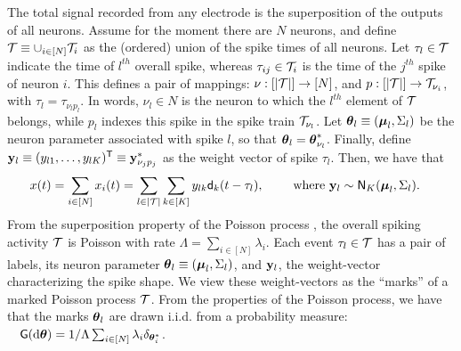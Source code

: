 % 
% 
% 
% 
{The total signal recorded from any electrode  is the superposition of the outputs of all neurons. Assume for the moment there are $N$
neurons, and define $\mathcal{T} \equiv \cup_{i \in [N]} \mathcal{T}_i$ as
the (ordered) union of the spike times of all neurons. 
Let $\tau_l \in \mathcal{T}$ indicate the time of $l^{th}$ overall spike, whereas $\tau_{ij} \in \mathcal{T}_i$ is the time of the $j^{th}$ spike of neuron $i$.
This defines a pair of mappings: $\nu:[|\mathcal{T}|]\rightarrow [N]$, and $p:[|\mathcal{T}|]\rightarrow \mathcal{T}_{\nu_i}$, with %
$\tau_l = \tau_{\nu_l p_l}$. 
In words, $\nu_l \in N$ is the neuron to which the $l^{th}$ element of $\mathcal{T}$ belongs, 
while $p_l$ indexes this spike in the spike train $\mathcal{T}_{\nu_l}$.
Let $\boldsymbol{\theta}_l \equiv (\boldsymbol{\mu}_l, \Sigma_l)$ be the neuron parameter associated with spike $l$, so that $\boldsymbol{\theta}_l = \boldsymbol{\theta}^*_{\nu_l}$. 
Finally, define $\mathbf{y}_l \equiv (y_{l1}, \ldots, y_{lK})^{\mathsf{T}} \equiv \mathbf{y}^*_{\nu_j p_j}$ as the weight vector of spike $\tau_l$. Then, we have that}
\begin{align}
  x(t) &= \sum_{i \in [N]} x_{i}(t) =   \sum_{l \in |\mc{T}|} \sum_{k \in [K]} y_{lk} \mathsf{d}_k(t - \tau_{l}), \qquad %
  \text{ where } \by_{l}  \sim \mathsf{N}_K(\mb{\mu}_{l}, \Sigma_{l}). \label{eq:spk}
\end{align}
% 
From the superposition property of the Poisson process \citep{kingman93}, the overall spiking activity $\mathcal{T}$ is 
Poisson with rate $\Lambda = \sum_{i \in [N]} \lambda_i$. Each event $\tau_l \in \mathcal{T}$ has a pair of labels, its neuron parameter
$\boldsymbol{\theta}_l \equiv (\boldsymbol{\mu}_l, \Sigma_l)$, and $\mathbf{y}_l$, the weight-vector characterizing the spike shape. We view these weight-vectors as the ``marks'' of a 
marked Poisson process $\mathcal{T}$.  From the properties of the Poisson process, we have that the marks $\boldsymbol{\theta}_l$ are drawn i.i.d. from a probability measure:
$\quad  \mathsf{G}(\mathrm{d} \boldsymbol{\theta}) = 1/\Lambda\sum_{i \in [N]} \lambda_i \delta_{\boldsymbol{\theta}^*_i}$.

